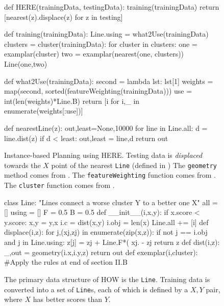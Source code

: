 

\begin{figure} 
\begin{python}[right]
def HERE(trainingData, testingData):
  training(trainingData)
  return [nearest(z).displace(z) 
          for z in testing]

def training(trainingData):
  Line.using = what2Use(trainingData)
  clusters = cluster(trainingData):
  for cluster in clusters:
    one = examplar(cluster)
    two = examplar(nearest(one, clusters))
    Line(one,two)
  
def what2Use(trainingData):
  second  = lambda lst: lst[1]
  weights = map(second,
                sorted(featureWeighting(trainingData)))
  use    = int(len(weights)*Line.B)
  return [i for i,_ in enumerate(weights[:use])]

def nearestLine(z):
  out,least=None,10000
  for line in Line.all:
    d = line.dist(z)
    if d < least: out,least = line,d
  return out
\end{python}
\caption{Instance-based Planning using HERE.
Testing data is {\em displaced}
towards   the $X$ point of the nearest {\tt Line} (defined in )
The {\tt geometry} method comes from .
The {\tt featureWeighting} function comes from .
The {\tt cluster} function comes from .
}\label{fig:HERE}   
\end{figure}



\begin{figure} 
\begin{python}[right]
class Line:
  "Lines connect a worse cluster Y to a better one X"
  all   = []
  using = []
  F     = 0.5
  B     = 0.5
   def __init__(i,x,y):
    if x.score < y.score:
      x,y = y,x
    i.c = dist(x,y) 
    i.obj = len(x) 
    Line.all += [i]
  def displace(i,z):
    for j,(xj,zj) in enumerate(zip(x,z)):
      if not j == i.obj and  j in Line.using:
         z[j] = zj + Line.F*( xj. - zj
    return z
  def dist(i,z):
    _,out = geometry(i.x,i.y,z)
    return out
  def exemplar(i,cluster):
    #Apply the rules at end of section II.B
\end{python}
\caption{The primary data structure of HOW
is the {\tt Line}.
Training data is converted into a set of {\tt Line}s,
each of which is defined by a $X,Y$ pair, where $X$
has better scores than $Y$. }\label{fig:line}
\end{figure}




